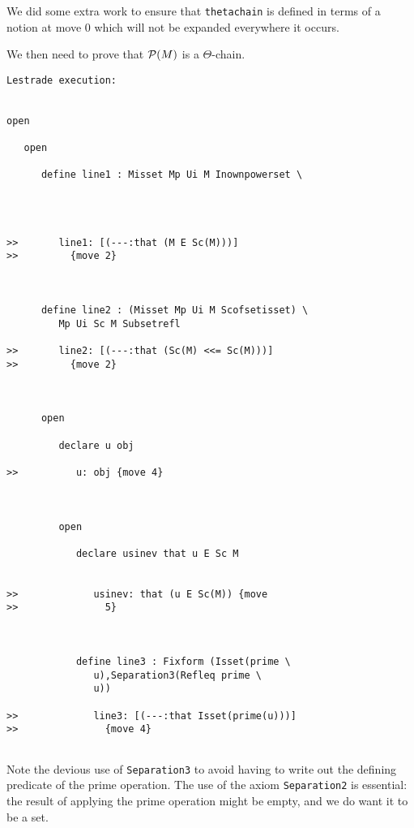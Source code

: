 \documentclass[12pt]{article}
\begin{document}
We did some extra work to ensure that {\tt thetachain} is defined in terms of a notion at move 0 which will not be expanded everywhere it occurs.

We then need to prove that ${\cal P}(M)$ is a $\Theta$-chain.

\begin{verbatim}Lestrade execution:


open

   open

      define line1 : Misset Mp Ui M Inownpowerset \
         



>>       line1: [(---:that (M E Sc(M)))]
>>         {move 2}



      define line2 : (Misset Mp Ui M Scofsetisset) \
         Mp Ui Sc M Subsetrefl

>>       line2: [(---:that (Sc(M) <<= Sc(M)))]
>>         {move 2}



      open

         declare u obj

>>          u: obj {move 4}



         open

            declare usinev that u E Sc M


>>             usinev: that (u E Sc(M)) {move
>>               5}



            define line3 : Fixform (Isset(prime \
               u),Separation3(Refleq prime \
               u))

>>             line3: [(---:that Isset(prime(u)))]
>>               {move 4}


\end{verbatim}

Note the devious use of {\tt Separation3} to avoid having to write out the defining predicate of the prime operation.  The use of the axiom
{\tt Separation2} is essential:  the result of applying the prime operation might be empty, and we do want it to be a set.
\end{document}
